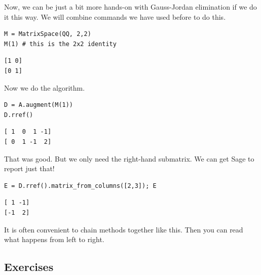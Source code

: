 \documentclass[10pt,]{book}
\theoremstyle{plain}
\theoremstyle{definition}
\numberwithin{equation}{section}
\begin{document}
      Now, we can be just a bit more hands-on with Gauss-Jordan elimination
      if we do it this way. We will combine commands we have used before to
      do this.
\begin{lstlisting}[style=sageinput]
M = MatrixSpace(QQ, 2,2)
M(1) # this is the 2x2 identity
\end{lstlisting}
\begin{lstlisting}[style=sageoutput]
[1 0]
[0 1]
\end{lstlisting}
\par

      Now we do the algorithm.
\begin{lstlisting}[style=sageinput]
D = A.augment(M(1))
D.rref()
\end{lstlisting}
\begin{lstlisting}[style=sageoutput]
[ 1  0  1 -1]
[ 0  1 -1  2]
\end{lstlisting}
\par

      That was good. But we only need the right-hand submatrix. We can get Sage
      to report just that!
\begin{lstlisting}[style=sageinput]
E = D.rref().matrix_from_columns([2,3]); E
\end{lstlisting}
\begin{lstlisting}[style=sageoutput]
[ 1 -1]
[-1  2]
\end{lstlisting}
\par

      It is often convenient to chain methods together like this. Then you can
      read what happens from left to right.
\typeout{************************************************}
\typeout{************************************************}
\subsection[Exercises]{Exercises}\label{subsection-45}
\end{document}
